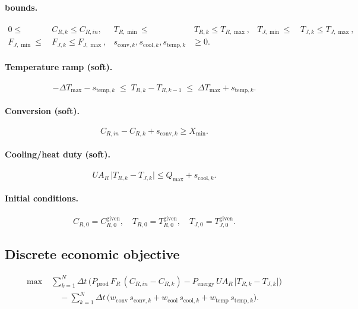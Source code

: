 \documentclass[11pt]{article}
\begin{document}
\paragraph{bounds.}
\begin{align}
    0 \le &\, C_{R,k} \le C_{R,in}, &
    T_{R,\min} \le &\, T_{R,k} \le T_{R,\max}, &
    T_{J,\min} \le &\, T_{J,k} \le T_{J,\max},\\
    F_{J,\min} \le &\, F_{J,k} \le F_{J,\max}, &
    s_{\mathrm{conv},k}, s_{\mathrm{cool},k}, s_{\mathrm{temp},k} &\ge 0.
\end{align}

\paragraph{Temperature ramp (soft).}
\begin{equation}
    -\Delta T_{\max} - s_{\mathrm{temp},k}
    \;\le\; {T_{R,k} - T_{R,k-1}}
    \;\le\; \Delta T_{\max} + s_{\mathrm{temp},k}.
\end{equation}

\paragraph{Conversion (soft).}
\begin{equation}
    {C_{R,in} - C_{R,k}} + s_{\mathrm{conv},k} \ge X_{\min}.
\end{equation}

\paragraph{Cooling/heat duty (soft).}
\begin{equation}
    U A_R \,\lvert T_{R,k} - T_{J,k}\rvert \le Q_{\max} + s_{\mathrm{cool},k}.
\end{equation}

\paragraph{Initial conditions.}
\begin{equation}
    C_{R,0} = C_{R,0}^{\text{given}}, \quad
    T_{R,0} = T_{R,0}^{\text{given}}, \quad
    T_{J,0} = T_{J,0}^{\text{given}}.
\end{equation}

\subsection{Discrete economic objective}
\begin{align}
\max \; & \sum_{k=1}^N \Delta t \,\Big(
    P_{\mathrm{prod}}\,F_R\,(C_{R,in} - C_{R,k})
    - P_{\mathrm{energy}}\,U A_R\,\lvert T_{R,k} - T_{J,k}\rvert
\Big) \nonumber\\[-2pt]
& \quad - \sum_{k=1}^N \Delta t \,\big(
      w_{\mathrm{conv}}\,s_{\mathrm{conv},k}
    + w_{\mathrm{cool}}\,s_{\mathrm{cool},k}
    + w_{\mathrm{temp}}\,s_{\mathrm{temp},k}
\big).
\end{align}
\end{document}
